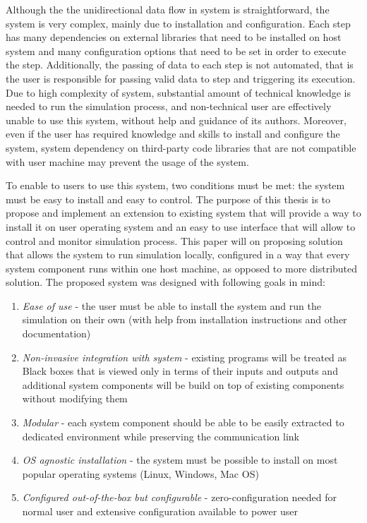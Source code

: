 Although the the unidirectional data flow in system is straightforward, the system is very complex, mainly due to installation and configuration. Each step has many dependencies on external libraries that need to be installed on host system and many configuration options that need to be set in order to execute the step. Additionally, the passing of data to each step is not automated, that is the user is responsible for passing valid data to step and triggering its execution. Due to high complexity of system, substantial amount of technical knowledge is needed to run the simulation process, and non-technical user are effectively unable to use this system, without help and guidance of its authors. Moreover, even if the user has required knowledge and skills to install and configure the system, system dependency on third-party code libraries that are not compatible with user machine may prevent the usage of the system. 

To enable to users to use this system, two conditions must be met: the system must be easy to install and easy to control. The purpose of this thesis is to propose and implement an extension to  existing system that will provide a way to install it on user operating system and an easy to use interface that will allow to control and monitor simulation process. This paper will on proposing solution that allows the system to run simulation locally, configured in a way that every system component runs within one host machine, as opposed to more distributed solution. The proposed system was designed with following goals in mind:
\begin{enumerate}
    \item {
        \textit{Ease of use} - the user must be able to install the system and run the simulation on their own (with help from installation instructions and other documentation)
    }
    \item {
        \textit{Non-invasive integration with system} - existing programs will be treated as Black boxes that is viewed only in terms of their inputs and outputs and additional system components will be build on top of existing components without modifying them
    }
    \item {
        \textit{Modular} - each system component should be able to be easily extracted to dedicated environment while preserving the communication link 
    }
    \item {
        \textit{OS agnostic installation} - the system must be possible to install on most popular operating systems (Linux, Windows, Mac OS)
    } 
    \item{
        \textit{Configured out-of-the-box but configurable} - zero-configuration needed for normal user and extensive configuration available to power user
    }
\end{enumerate}
